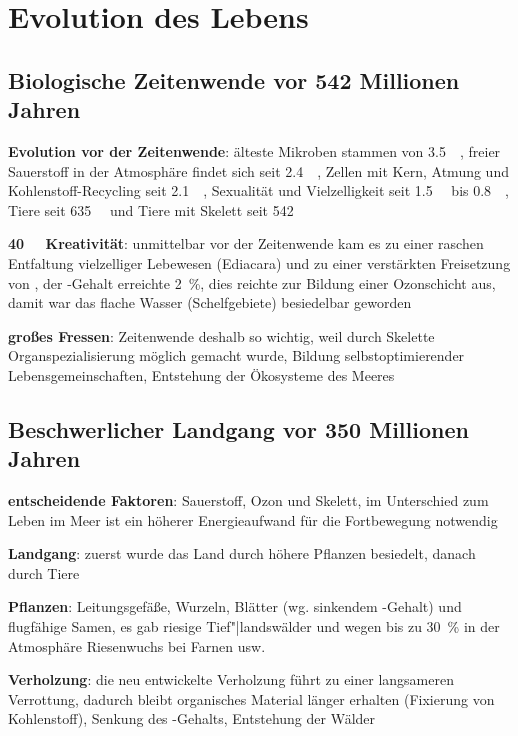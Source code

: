 \chapter{%
    Evolution des Lebens%
}

\section{%
    Biologische Zeitenwende vor 542 Millionen Jahren
}

\textbf{Evolution vor der Zeitenwende}:
älteste Mikroben stammen von \SI{3.5}{\giga\year},
freier Sauerstoff in der Atmosphäre findet sich seit \SI{2.4}{\giga\year},
Zellen mit Kern, Atmung und Kohlenstoff-Recycling seit \SI{2.1}{\giga\year},
Sexualität und Vielzelligkeit seit \SI{1.5}{\giga\year} bis \SI{0.8}{\giga\year},
Tiere seit \SI{635}{\mega\year} und
Tiere mit Skelett seit \SI{542}{\mega\year}

\textbf{\SI{40}{\mega\year} Kreativität}:
unmittelbar vor der Zeitenwende kam es zu einer raschen Entfaltung vielzelliger
Lebewesen (Ediacara) und zu einer verstärkten Freisetzung von ,
der -Gehalt erreichte \SI{2}{\percent}, dies reichte zur Bildung einer Ozonschicht aus,
damit war das flache Wasser (Schelfgebiete) besiedelbar geworden

\textbf{großes Fressen}:
Zeitenwende deshalb so wichtig, weil durch Skelette Organspezialisierung möglich gemacht wurde,
Bildung selbstoptimierender Lebensgemeinschaften,
Entstehung der Ökosysteme des Meeres

\section{%
    Beschwerlicher Landgang vor 350 Millionen Jahren%
}

\textbf{entscheidende Faktoren}:
Sauerstoff, Ozon und Skelett,
im Unterschied zum Leben im Meer ist ein höherer Energieaufwand für die Fortbewegung notwendig

\textbf{Landgang}:
zuerst wurde das Land durch höhere Pflanzen besiedelt, danach durch Tiere

\textbf{Pflanzen}:
Leitungsgefäße, Wurzeln, Blätter (wg. sinkendem -Gehalt)
und flugfähige Samen,
es gab riesige Tief"|landswälder und wegen bis zu \SI{30}{\percent}  in der Atmosphäre
Riesenwuchs bei Farnen usw.

\textbf{Verholzung}:
die neu entwickelte Verholzung führt zu einer langsameren Verrottung,
dadurch bleibt organisches Material länger erhalten (Fixierung von Kohlenstoff),
Senkung des -Gehalts,
Entstehung der Wälder


